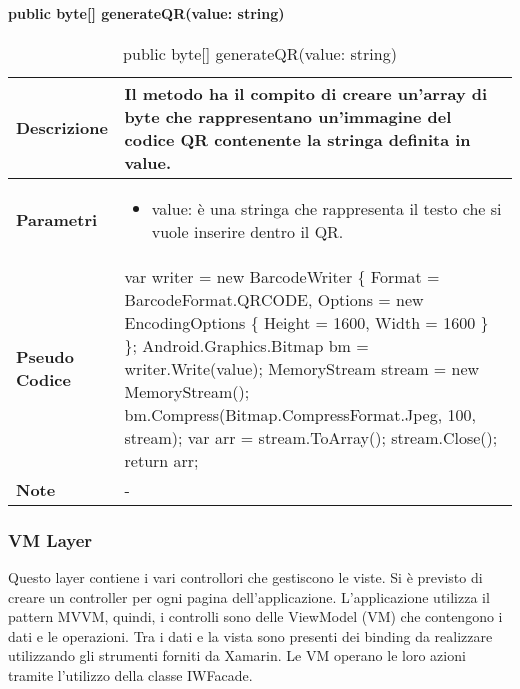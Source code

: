 \paragraph{public byte[] generateQR(value: string)}
\begin{center}
    \begin{longtable}{|p{3cm}|p{9cm}|}%
    \caption{public byte[] generateQR(value: string)}
    \endfirsthead
    \endhead
    \hline
    \textbf{Descrizione} & Il metodo ha il compito di creare un’array di byte che rappresentano un’immagine del codice QR contenente la stringa definita in value.\\
    \hline
    \textbf{Parametri} &      
    \begin{itemize}
        \item value: è una stringa che rappresenta il testo che si vuole inserire dentro il QR.
    \end{itemize}
    \\
    \hline
    \textbf{Pseudo Codice} & 
    var writer = \newline
    new BarcodeWriter \newline
    \{\newline
        Format = BarcodeFormat.QRCODE,\newline
        Options = new EncodingOptions\newline
        \{\newline
            Height = 1600,\newline
            Width = 1600\newline
        \}\newline
    \};\newline
    Android.Graphics.Bitmap bm =  writer.Write(value);\newline
    MemoryStream stream = new MemoryStream();\newline
    bm.Compress(Bitmap.CompressFormat.Jpeg, 100, stream);\newline
    var arr =  stream.ToArray();\newline
    stream.Close();\newline
    return arr;\newline
    \\
    \hline
    \textbf{Note} & 
    -
    \\
    \hline
    \end{longtable}
\end{center}


\subsubsection{VM Layer}
Questo layer contiene i vari controllori che gestiscono le viste. Si è previsto di creare un controller per ogni pagina dell’applicazione. L’applicazione utilizza il pattern MVVM, quindi, i controlli sono delle ViewModel (VM) che contengono i dati e le operazioni. Tra i dati e la vista sono presenti dei binding da realizzare utilizzando gli strumenti forniti da Xamarin. Le VM operano le loro azioni tramite l’utilizzo della classe IWFacade. 

